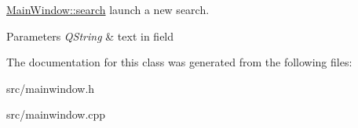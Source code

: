 \hyperlink{classMainWindow_aa186e57f984c98ea0266536df32acebd}{Main\+Window\+::search} launch a new search. 


\begin{DoxyParams}{Parameters}
{\em Q\+String} & text in field \\
\hline
\end{DoxyParams}


The documentation for this class was generated from the following files\+:\begin{DoxyCompactItemize}
\item 
src/mainwindow.\+h\item 
src/mainwindow.\+cpp\end{DoxyCompactItemize}
